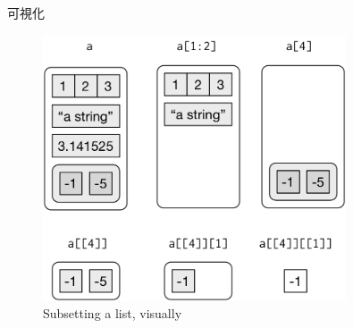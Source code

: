 \documentclass[ignorenonframetext,]{beamer}
\begin{document}
\begin{frame}{可視化}

\begin{figure}
\centering
\includegraphics[width=0.80000\textwidth]{../img/lists-subsetting.png}
\caption{Subsetting a list, visually}
\end{figure}

\end{frame}
\end{document}
